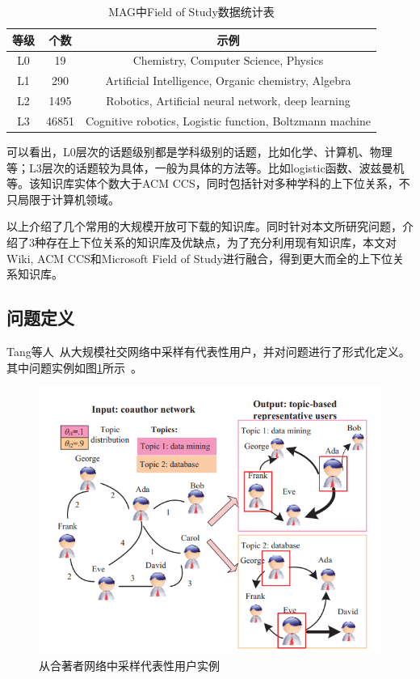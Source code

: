 \begin{table}[!ht]
	\centering
	\caption{MAG中Field of Study数据统计表\label{tab:fos_statistics}}
	\begin{tabular}{ccc}
		\toprule
		等级   & 个数&示例\\ \midrule
		L0 & 19 & Chemistry, Computer Science, Physics \\
		L1 & 290 & Artificial Intelligence, Organic chemistry, Algebra \\
		L2 & 1495 & Robotics, Artificial neural network, deep learning \\
		L3 & 46851 & Cognitive robotics, Logistic function, Boltzmann machine \\
		\bottomrule
	\end{tabular}
\end{table}

可以看出，L0层次的话题级别都是学科级别的话题，比如化学、计算机、物理等；L3层次的话题较为具体，一般为具体的方法等。比如logistic函数、波兹曼机等。该知识库实体个数大于ACM CCS，同时包括针对多种学科的上下位关系，不只局限于计算机领域。

以上介绍了几个常用的大规模开放可下载的知识库。同时针对本文所研究问题，介绍了3种存在上下位关系的知识库及优缺点，为了充分利用现有知识库，本文对Wiki, ACM CCS和Microsoft Field of Study进行融合，得到更大而全的上下位关系知识库。


\subsection{问题定义}

Tang等人~从大规模社交网络中采样有代表性用户，并对问题进行了形式化定义。其中问题实例如图\ref{fig:tang_sample}所示~。
\begin{figure}
	\centering
	\includegraphics[width=.85\linewidth]{./figures/tang_sample.png}
	\caption{从合著者网络中采样代表性用户实例}
	\label{fig:tang_sample}
\end{figure}

